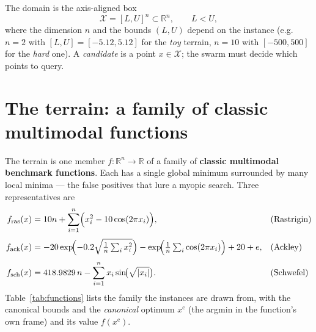 \documentclass[11pt,a4paper]{article}
\newcommand{\R}{\mathbb{R}}
\begin{document}
The domain is the axis-aligned box
\begin{equation}
  \mathcal{X} = [L, U]^{n} \subset \R^{n},
  \qquad L < U,
  \label{eq:domain}
\end{equation}
where the dimension $n$ and the bounds $(L, U)$ depend on the instance (e.g.\
$n = 2$ with $[L,U] = [-5.12, 5.12]$ for the \emph{toy} terrain, $n = 10$ with
$[-500, 500]$ for the \emph{hard} one). A \emph{candidate} is a point
$x \in \mathcal{X}$; the swarm must decide which points to query.

\section{The terrain: a family of classic multimodal functions}

The terrain is one member $f : \R^{n} \to \R$ of a family of \textbf{classic
multimodal benchmark functions}. Each has a single global minimum surrounded by
many local minima --- the false positives that lure a myopic search. Three
representatives are
\begin{align}
  f_{\text{ras}}(x) &= 10n + \sum_{i=1}^{n}\Bigl(x_{i}^{2}
      - 10\cos(2\pi x_{i})\Bigr),
      && \text{(Rastrigin)}\\[1mm]
  f_{\text{ack}}(x) &= -20\exp\!\Bigl(-0.2\sqrt{\tfrac1n\textstyle\sum_i x_i^2}\Bigr)
      - \exp\!\Bigl(\tfrac1n\textstyle\sum_i\cos(2\pi x_i)\Bigr) + 20 + e,
      && \text{(Ackley)}\\[1mm]
  f_{\text{sch}}(x) &= 418.9829\,n - \sum_{i=1}^{n} x_{i}\sin\!\bigl(\sqrt{|x_{i}|}\bigr).
      && \text{(Schwefel)}
\end{align}
Table~\ref{tab:functions} lists the family the instances are drawn from, with the
canonical bounds and the \emph{canonical} optimum $x^{\mathrm{c}}$ (the argmin in
the function's own frame) and its value $f(x^{\mathrm{c}})$.
\end{document}
